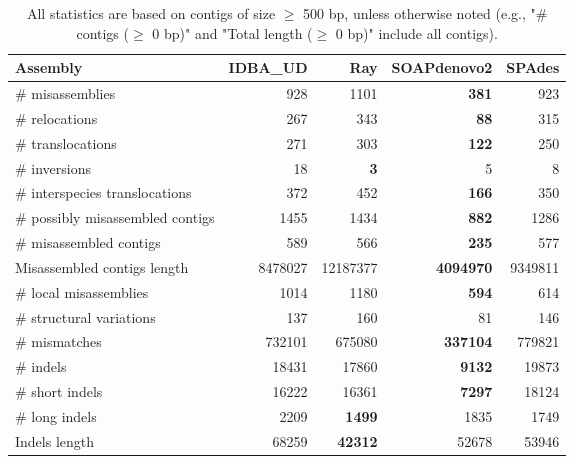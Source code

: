\documentclass[12pt,a4paper]{article}
\begin{document}
\begin{table}[ht]
\begin{center}
\caption{All statistics are based on contigs of size $\geq$ 500 bp, unless otherwise noted (e.g., "\# contigs ($\geq$ 0 bp)" and "Total length ($\geq$ 0 bp)" include all contigs).}
\begin{tabular}{|l*{4}{|r}|}
\hline
Assembly & IDBA\_UD & Ray & SOAPdenovo2 & SPAdes \\ \hline
\# misassemblies & 928 & 1101 & {\bf 381} & 923 \\ \hline
\hspace{5mm}\# relocations & 267 & 343 & {\bf 88} & 315 \\ \hline
\hspace{5mm}\# translocations & 271 & 303 & {\bf 122} & 250 \\ \hline
\hspace{5mm}\# inversions & 18 & {\bf 3} & 5 & 8 \\ \hline
\hspace{5mm}\# interspecies translocations & 372 & 452 & {\bf 166} & 350 \\ \hline
\# possibly misassembled contigs & 1455 & 1434 & {\bf 882} & 1286 \\ \hline
\# misassembled contigs & 589 & 566 & {\bf 235} & 577 \\ \hline
Misassembled contigs length & 8478027 & 12187377 & {\bf 4094970} & 9349811 \\ \hline
\# local misassemblies & 1014 & 1180 & {\bf 594} & 614 \\ \hline
\# structural variations & 137 & 160 & 81 & 146 \\ \hline
\# mismatches & 732101 & 675080 & {\bf 337104} & 779821 \\ \hline
\# indels & 18431 & 17860 & {\bf 9132} & 19873 \\ \hline
\hspace{5mm}\# short indels & 16222 & 16361 & {\bf 7297} & 18124 \\ \hline
\hspace{5mm}\# long indels & 2209 & {\bf 1499} & 1835 & 1749 \\ \hline
Indels length & 68259 & {\bf 42312} & 52678 & 53946 \\ \hline
\end{tabular}
\end{center}
\end{table}
\end{document}
